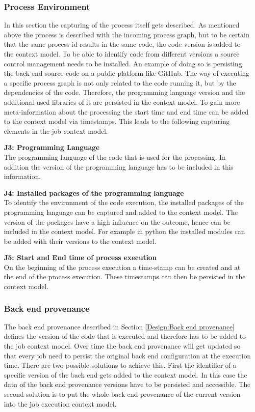 \documentclass[draft,final]{vutinfth} %
\begin{document}
\subsubsection{Process Environment}\label{Job:Process Data}
In this section the capturing of the process itself gets described. As mentioned above the process is described with the incoming process graph, but to be certain that the same process id results in the same code, the code version is added to the context model. To be able to identify code from different versions a source control management needs to be installed. An example of doing so is persisting the back end source code on a public platform like GitHub. 
The way of executing a specific process graph is not only related to the code running it, but by the dependencies of the code. Therefore, the programming language version and the additional used libraries of it are persisted in the context model.  To gain more meta-information about the processing the start time and end time can be added to the context model via timestamps. This leads to the following capturing elements in the job context model.

\textbf{J3: Programming Language}\\
The programming language of the code that is used for the processing. In addition the version of the programming language has to be included in this information.

\textbf{J4: Installed packages of the programming language}\\
To identify the environment of the code execution, the installed packages of the programming language can be captured and added to the context model. The version of the packages have a high influence on the outcome, hence can be included in the context model. For example in python the installed modules can be added with their versions to the context model.

\textbf{J5: Start and End time of process execution}\\
On the beginning of the process execution a time-stamp can be created and at the end of the process execution. These timestamps can then be persisted in the context model.

\subsubsection{Back end provenance}\label{Job:Back end provenance}
The back end provenance described in Section \ref{Design:Back end provenance} defines the version of the code that is executed and therefore has to be added to the job context model. Over time the back end provenance will get updated so that every job need to persist the original back end configuration at the execution time. There are two possible solutions to achieve this. First the identifier of a specific version of the back end gets added to the context model. In this case the data of the back end provenance versions have to be persisted and accessible. The second solution is to put the whole back end provenance of the current version into the job execution context model.
\end{document}
